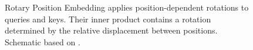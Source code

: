 
\begin{figure}[htbp]
    \centering
    \setlength{\unitlength}{1mm}
    \caption{Rotary Position Embedding applies position-dependent rotations
    to queries and keys. Their inner product contains a rotation determined
    by the relative displacement between positions. Schematic based on
    \textcite{zhang2024foundmiddle}.}
    \label{fig:pe-rope-relative-position}
\end{figure}
